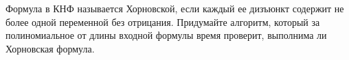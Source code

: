 Формула в КНФ называется Хорновской, если каждый ее дизъюнкт содержит не более одной переменной без отрицания. Придумайте
алгоритм, который за полиномиальное от длины входной формулы время проверит, выполнима ли Хорновская формула.